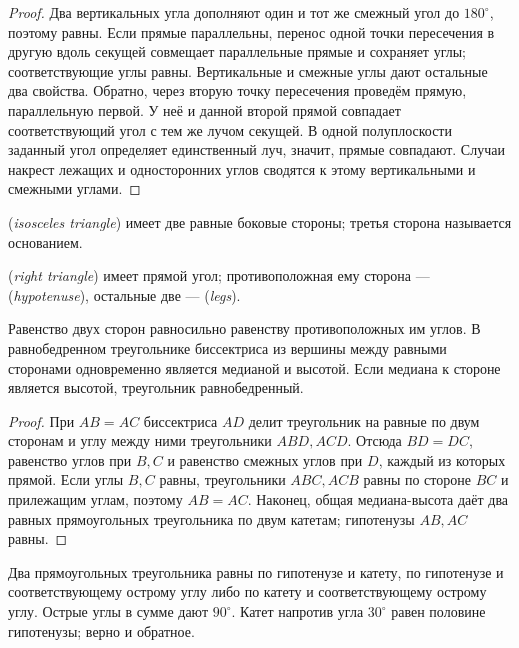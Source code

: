 \begin{proof}Два вертикальных угла дополняют один и тот же смежный угол до \(180^\circ\), поэтому равны. Если прямые параллельны, перенос одной точки пересечения в другую вдоль секущей совмещает параллельные прямые и сохраняет углы; соответствующие углы равны. Вертикальные и смежные углы дают остальные два свойства. Обратно, через вторую точку пересечения проведём прямую, параллельную первой. У неё и данной второй прямой совпадает соответствующий угол с тем же лучом секущей. В одной полуплоскости заданный угол определяет единственный луч, значит, прямые совпадают. Случаи накрест лежащих и односторонних углов сводятся к этому вертикальными и смежными углами.\end{proof}

\begin{definition} (\emph{isosceles triangle}) имеет две равные боковые стороны; третья сторона называется основанием.
\par{} (\emph{right triangle}) имеет прямой угол; противоположная ему сторона —  (\emph{hypotenuse}), остальные две —  (\emph{legs}).\end{definition}
\begin{theorem}
Равенство двух сторон равносильно равенству противоположных им углов. В равнобедренном треугольнике биссектриса из вершины между равными сторонами одновременно является медианой и высотой. Если медиана к стороне является высотой, треугольник равнобедренный.
\end{theorem}
\begin{proof}При \(AB=AC\) биссектриса \(AD\) делит треугольник на равные по двум сторонам и углу между ними треугольники \(ABD,ACD\). Отсюда \(BD=DC\), равенство углов при \(B,C\) и равенство смежных углов при \(D\), каждый из которых прямой. Если углы \(B,C\) равны, треугольники \(ABC,ACB\) равны по стороне \(BC\) и прилежащим углам, поэтому \(AB=AC\). Наконец, общая медиана-высота даёт два равных прямоугольных треугольника по двум катетам; гипотенузы \(AB,AC\) равны.\end{proof}
\begin{theorem}
Два прямоугольных треугольника равны по гипотенузе и катету, по гипотенузе и соответствующему острому углу либо по катету и соответствующему острому углу. Острые углы в сумме дают \(90^\circ\). Катет напротив угла \(30^\circ\) равен половине гипотенузы; верно и обратное.
\end{theorem}
